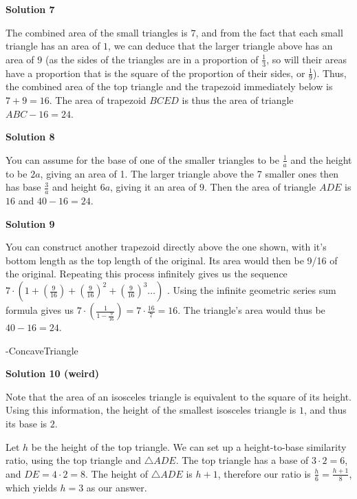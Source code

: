 \begin{enumerate}
 



\textbf{Solution 7}

The combined area of the small triangles is $7$, and from the fact that each small triangle has an area of $1$, we can deduce that the larger triangle above has an area of $9$ (as the sides of the triangles are in a proportion of $\frac{1}{3}$, so will their areas have a proportion that is the square of the proportion of their sides, or $\frac {1}{9}$). Thus, the combined area of the top triangle and the trapezoid immediately below is $7 + 9 = 16$. The area of trapezoid $BCED$ is thus the area of triangle $ABC-16 =\boxed{24}$. 

 



\textbf{Solution 8}

You can assume for the base of one of the smaller triangles to be $\frac{1}{a}$ and the height to be $2a$, giving an area of 1. The larger triangle above the 7 smaller ones then has base $\frac{3}{a}$ and height $6a$, giving it an area of $9$. Then the area of triangle $ADE$ is $16$ and $40-16=\boxed{24}$.

 



\textbf{Solution 9}

You can construct another trapezoid directly above the one shown, with it's bottom length as the top length of the original. Its area would then be 9/16 of the original. Repeating this process infinitely gives us the sequence $7\cdot\left(1+\left(\frac{9}{16}\right)+\left(\frac{9}{16}\right)^2+\left(\frac{9}{16}\right)^3\dots\right)$ . Using the infinite geometric series sum formula gives us $7\cdot\left(\frac{1}{1-\frac{9}{16}}\right)=7\cdot\frac{16}{7}=16$. The triangle's area would thus be $40-16=\boxed{24}$.  

 -ConcaveTriangle

 



\textbf{Solution 10 (weird)}

Note that the area of an isosceles triangle is equivalent to the square of its height. Using this information, the height of the smallest isosceles triangle is $1$, and thus its base is $2.$ 

 Let $h$ be the height of the top triangle. We can set up a height-to-base similarity ratio, using the top triangle and $\triangle{ADE}$. The top triangle has a base of $3\cdot{2}=6$, and $DE=4\cdot{2}=8.$ The height of $\triangle{ADE}$ is $h+1$, therefore our ratio is $\frac{h}{6}=\frac{h+1}{8}$, which yields $h=3$ as our answer. 


\end{enumerate}

